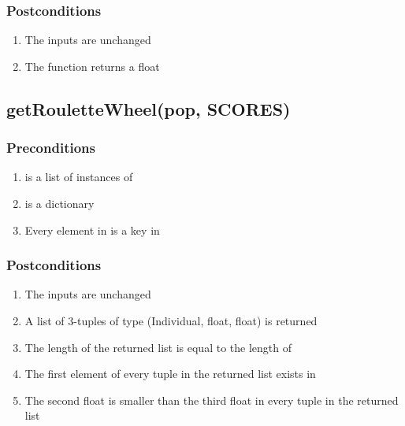 \documentclass[letterpaper,10pt,english]{sphinxmanual}
\begin{document}
\subsubsection{Postconditions}
\label{contracts:id28}\begin{enumerate}
\item {} 
The inputs are unchanged

\item {} 
The function returns a float

\end{enumerate}


\subsection{getRouletteWheel(pop, SCORES)}
\label{contracts:getroulettewheel-pop-scores}

\subsubsection{Preconditions}
\label{contracts:id29}\begin{enumerate}
\item {} 
 is a list of instances of 

\item {} 
 is a dictionary

\item {} 
Every element in  is a key in 

\end{enumerate}


\subsubsection{Postconditions}
\label{contracts:id30}\begin{enumerate}
\item {} 
The inputs are unchanged

\item {} 
A list of 3-tuples of type (Individual, float, float) is returned

\item {} 
The length of the returned list is equal to the length of 

\item {} 
The first element of every tuple in the returned list exists in 

\item {} 
The second float is smaller than the third float in every tuple in the returned list

\end{enumerate}
\end{document}
